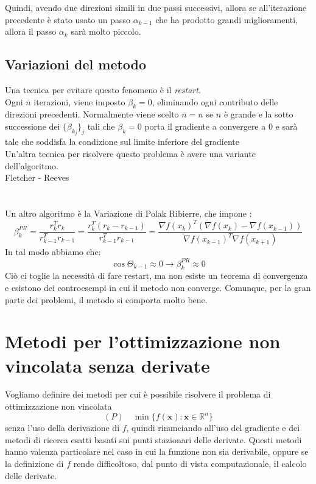 Quindi, avendo due direzioni simili in due passi successivi, allora se
all'iterazione precedente \`e stato usato un passo $\alpha_{k-1}$ che ha
prodotto grandi miglioramenti, allora il passo $\alpha_{k}$ sarà molto
piccolo.\\
\section{Variazioni del metodo} Una tecnica per evitare questo
fenomeno \`e il \emph{restart}. \\ Ogni $\overline{n}$ iterazioni, viene
imposto $\beta_{k} =0$, eliminando ogni contributo delle direzioni
precedenti.  Normalmente viene scelto $\overline{n} = n $ se $n$ \`e
grande e la sotto successione dei $\{\beta_{k_{j}} \}_{j}$ tali che
$\beta_{k}=0$ porta il gradiente a convergere a 0 e sarà tale che
soddisfa la condizione sul limite inferiore del gradiente \\ Un'altra
tecnica per risolvere questo problema \`e avere una variante
dell'algoritmo.  \\ %
Fletcher - Reeves \\ \\ \\ Un altro algoritmo \`e la Variazione di Polak
Ribierre, che impone :
$$\beta_{k}^{PR} = \frac{r_{k}^{T} r_{k}}{ r_{k-1}^{T} r_{k-1}} = \frac{r_{k}^{T}(r_{k} - r_{k-1}) }{ r^{T}_{k-1} r_{k-1}} = \frac{ \nabla f(x_{k})^{T} (\nabla f(x_{k}) 
  - \nabla f(x_{k-1})) }{\nabla f(x_{k-1})^{T} \nabla f(x_{k+1})}$$ In
tal modo abbiamo che:
$$ \cos \Theta_{k-1} \approx 0 \rightarrow \beta_{k}^{PR} \approx 0$$
Ciò ci toglie la necessità di fare restart, ma non esiste un teorema
di convergenza e esistono dei controesempi in cui il metodo non
converge. Comunque, per la gran parte dei problemi, il metodo si
comporta molto bene.


\chapter{Metodi per l'ottimizzazione non vincolata senza derivate}
Vogliamo definire dei metodi per cui \`e possibile risolvere il problema
di ottimizzazione non vincolata
$$ (P) \quad \min \{ f(\mathbf{x}): \mathbf{x} \in \mathbb{R}^{n}\} $$
senza l'uso della derivazione di $f$, quindi rinunciando all'uso del
gradiente e dei metodi di ricerca esatti basati sui punti stazionari
delle derivate. Questi metodi hanno valenza particolare nel caso in
cui la funzione non sia derivabile, oppure se la definizione di $f$
rende difficoltoso, dal punto di vista computazionale, il calcolo
delle derivate. \\

